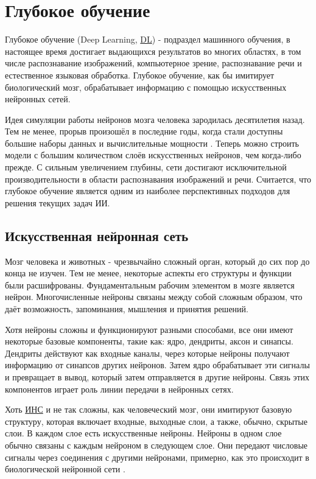 \section{Глубокое обучение} \label{ch1:dl}

Глубокое обучение (Deep Learning, \hyperref[acr:dl]{DL}) - подраздел машинного обучения, в настоящее время достигает выдающихся результатов во многих областях, в том числе распознавание изображений, компьютерное зрение, распознавание речи и естественное языковая обработка. Глубокое обучение, как бы имитирует биологический мозг, обрабатывает информацию с помощью искусственных нейронных сетей.

Идея симуляции работы нейронов мозга человека зародилась десятилетия назад. Тем не менее, прорыв произошёл в последние годы, когда стали доступны большие наборы данных и вычислительные мощности \cite{10.1145/2771283}. Теперь можно строить модели с большим количеством слоёв искусственных нейронов, чем когда-либо прежде. С сильным увеличением глубины, сети достигают исключительной производительности в области распознавания изображений и речи. Считается, что глубокое обучение является одним из наиболее перспективных подходов для решения текущих задач ИИ.

\subsection{Искусственная нейронная сеть}

Мозг человека и животных - чрезвычайно сложный орган, который до сих пор до конца не изучен. Тем не менее, некоторые аспекты его структуры и функции были расшифрованы. Фундаментальным рабочим элементом в мозге является нейрон. Многочисленные нейроны связаны между собой сложным образом, что даёт возможность, запоминания, мышления и принятия решений.

Хотя нейроны сложны и функционируют разными способами, все они имеют некоторые базовые компоненты, такие как: ядро, дендриты, аксон и синапсы. Дендриты действуют как входные каналы, через которые нейроны получают информацию от синапсов других нейронов. Затем ядро обрабатывает эти сигналы и превращает в вывод, который затем отправляется в другие нейроны. Связь этих компонентов играет роль линии передачи в нейронных сетях.

Хоть \hyperref[acr:ann]{ИНС} и не так сложны, как человеческий мозг, они имитируют базовую структуру, которая включает входные, выходные слои, а также, обычно, скрытые слои. В каждом слое есть искусственные нейроны. Нейроны в одном слое обычно связаны с каждым нейроном в следующем слое. Они передают числовые сигналы через соединения с другими нейронами, примерно, как это происходит в биологической нейронной сети \cite{296402}.

